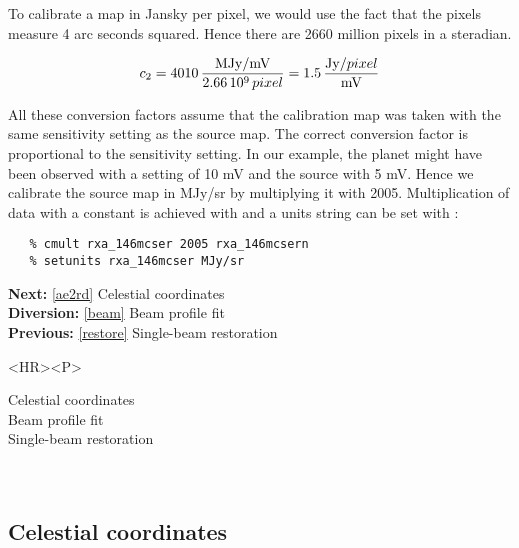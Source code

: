    To calibrate a map in Jansky per pixel, we would use the fact that
   the pixels measure 4 arc seconds squared. Hence there are 2660
   million pixels in a steradian.

\[c_2 = 4010\,{{\rm MJy/mV}   \over 2.66\,10^9\,pixel}
      =  1.5\,{{\rm Jy}/pixel \over {\rm mV}}\]

   All these conversion factors assume that the calibration map was
   taken with the same sensitivity setting as the source map. The
   correct conversion factor is proportional to the sensitivity
   setting. In our example, the planet might have been observed with a
   setting of 10 mV and the source with 5 mV. Hence we calibrate the
   source map in MJy/sr by multiplying it with 2005.
   Multiplication of data with a constant is achieved with
{\tt {}}
   and a units string can be set with
{\tt {}}:

\begin{verbatim}
   % cmult rxa_146mcser 2005 rxa_146mcsern
   % setunits rxa_146mcser MJy/sr
\end{verbatim}

\begin{latexonly}
{\bf Next:} \ref{ae2rd} Celestial coordinates\\
{\bf Diversion:} \ref{beam} Beam profile fit\\
{\bf Previous:} \ref{restore} Single-beam restoration\\
\end{latexonly}

\begin{htmlonly}
\begin{rawhtml} <HR><P> \end{rawhtml}
{\bf {}} Celestial coordinates\\
{\bf {}} Beam profile fit\\
{\bf {}} Single-beam restoration\\
{\bf {}}\\
{\bf {}}\\
\end{htmlonly}


\subsection{\label{ae2rd}Celestial coordinates}

